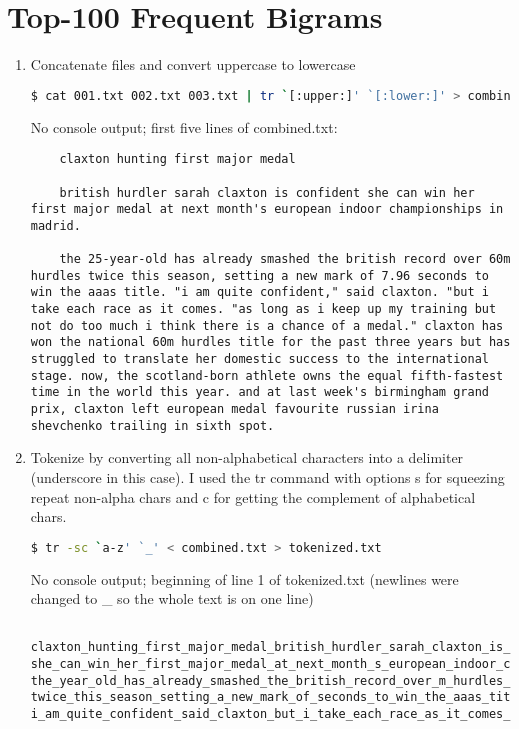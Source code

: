 \documentclass{article}
\begin{document}
\section{Top-100 Frequent Bigrams}
\begin{enumerate} 
  \item Concatenate files and convert uppercase to lowercase
  \begin{lstlisting}[language=bash]
    $ cat 001.txt 002.txt 003.txt | tr `[:upper:]' `[:lower:]' > combined.txt\end{lstlisting} %
  No console output; first five lines of combined.txt: 
  \begin{lstlisting}
    claxton hunting first major medal
    
    british hurdler sarah claxton is confident she can win her first major medal at next month's european indoor championships in madrid.
    
    the 25-year-old has already smashed the british record over 60m hurdles twice this season, setting a new mark of 7.96 seconds to win the aaas title. "i am quite confident," said claxton. "but i take each race as it comes. "as long as i keep up my training but not do too much i think there is a chance of a medal." claxton has won the national 60m hurdles title for the past three years but has struggled to translate her domestic success to the international stage. now, the scotland-born athlete owns the equal fifth-fastest time in the world this year. and at last week's birmingham grand prix, claxton left european medal favourite russian irina shevchenko trailing in sixth spot.  \end{lstlisting}

  \item Tokenize by converting all non-alphabetical characters into a delimiter (underscore in this case). I used the tr command with options s for squeezing repeat non-alpha chars and c for getting the complement of alphabetical chars.
  \begin{lstlisting}[language=bash]
    $ tr -sc `a-z' `_' < combined.txt > tokenized.txt\end{lstlisting} %
  No console output; beginning of line 1 of tokenized.txt (newlines were changed to \_ so the whole text is on one line)
  \begin{lstlisting}
    claxton_hunting_first_major_medal_british_hurdler_sarah_claxton_is_confident_ she_can_win_her_first_major_medal_at_next_month_s_european_indoor_championships_in_madrid_ the_year_old_has_already_smashed_the_british_record_over_m_hurdles_ twice_this_season_setting_a_new_mark_of_seconds_to_win_the_aaas_title_ i_am_quite_confident_said_claxton_but_i_take_each_race_as_it_comes_...\end{lstlisting}


\end{enumerate}
\end{document}
